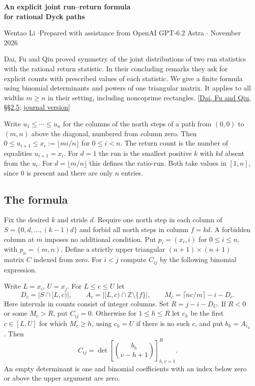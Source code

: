 \documentclass[11pt]{article}
\begin{document}
\begin{center}{\Large\bfseries An explicit joint run--return formula\\ for rational Dyck paths}\par
\small Wentao Li \enspace$\cdot$\enspace Prepared with assistance from OpenAI GPT-6.2 Astra \enspace$\cdot$ November 2026\end{center}

Dai, Fu and Qiu proved symmetry of the joint distributions of two run statistics with the rational return statistic. In their concluding remarks they ask for explicit counts with prescribed values of each statistic. We give a finite formula using binomial determinants and powers of one triangular matrix. It applies to all widths $m\ge n$ in their setting, including noncoprime rectangles. [\href{https://arxiv.org/abs/2503.20155}{Dai, Fu and Qiu, \S\S2,5}; \href{https://doi.org/10.1016/j.aam.2026.103066}{journal version}]

Write $u_1\le\cdots\le u_n$ for the columns of the north steps of a path from $(0,0)$ to $(m,n)$ above the diagonal, numbered from column zero. Then $0\le u_{i+1}\le x_i:=\lfloor mi/n\rfloor$ for $0\le i<n$. The return count is the number of equalities $u_{i+1}=x_i$. For $d=1$ the run is the smallest positive $k$ with $kd$ absent from the $u_i$. For $d=\lfloor m/n\rfloor$ this defines the ratio-run. Both take values in $[1,n]$, since $0$ is present and there are only $n$ entries.

\subsection*{The formula}
Fix the desired $k$ and stride $d$. Require one north step in each column of $S=\{0,d,\ldots,(k-1)d\}$ and forbid all north steps in column $f=kd$. A forbidden column at $m$ imposes no additional condition. Put $p_i=(x_i,i)$ for $0\le i\le n$, with $p_n=(m,n)$. Define a strictly upper triangular $(n+1)\times(n+1)$ matrix $C$ indexed from zero. For $i<j$ compute $C_{ij}$ by the following binomial expression.

Write $L=x_i$, $U=x_j$. For $L\le c\le U$ let
\[
 D_c=|S\cap[L,c)|,\qquad A_c=|[L,c)\cap\mathbb Z\setminus\{f\}|,\qquad
 M_c=\lceil nc/m\rceil-i-D_c .
\]
Here intervals in counts consist of integer columns. Set $R=j-i-D_U$. If $R<0$ or some $M_c>R$, put $C_{ij}=0$. Otherwise for $1\le h\le R$ let $c_h$ be the first $c\in[L,U]$ for which $M_c\ge h$, using $c_h=U$ if there is no such $c$, and put $b_h=A_{c_h}$. Then
\[
 C_{ij}=\det\left[\binom{b_h}{v-h+1}\right]_{h,v=1}^{R}.
 \tag{1}
\]
An empty determinant is one and binomial coefficients with an index below zero or above the upper argument are zero.
\end{document}
